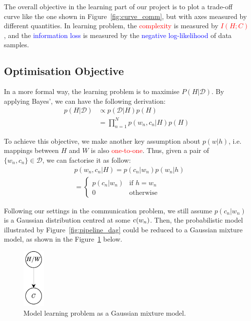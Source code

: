 \documentclass[11pt]{article}
\begin{document}
The overall objective in the learning part of our project is to plot a trade-off curve like the one shown in Figure~\ref{fig:curve_comm}, but with axes measured by different quantities.
In learning problem, the \textcolor{red}{complexity} is measured by \textcolor{red}{$I(H;C)$}, and the \textcolor{blue}{information loss} is measured by the \textcolor{blue}{negative log-likelihood} of data samples. 


\subsection{Optimisation Objective}
\label{ssec:learn_optim}

In a more formal way, the learning problem is to maximise $P(H|\mathcal{D})$. 
By applying Bayes', we can have the following derivation:
\begin{equation}
    \begin{split}
        p(H|\mathcal{D})
        & \propto p(\mathcal{D}|H)p(H) \\
        & = \prod_{n=1}^{N} p(w_n, c_n|H)p(H)
    \end{split}
    \label{eq:learning_objective_pH_D}
\end{equation}

To achieve this objective, we make another key assumption about $p(w|h)$, i.e. mappings between $H$ and $W$ is also \textcolor{red}{one-to-one}.
Thus, given a pair of $\{w_n, c_n\}\in\mathcal{D}$, we can factorise it as follow:
\begin{equation}
    \begin{aligned}
     & p(w_n, c_n|H) = p(c_n|w_n)p(w_n|h) \\
     & =
        \begin{cases}
            p(c_n|w_n) & \text{if $h=w_n$}\\
            0 & \text{otherwise}
        \end{cases} 
    \end{aligned}
    \label{eq:factorise_data_pair}
\end{equation}

Following our settings in the communication problem, we still assume $p(c_n|w_n)$ is a Gaussian distribution centred at some ${\textnormal{c}}(w_n)$.
Then, the probabilistic model illustrated by Figure~\ref{fig:pipeline_dag} could be reduced to a Gaussian mixture model, as shown in the Figure~\ref{fig:learn_gaussian_mix} below.
\begin{figure}[h]
    \centering
    \includegraphics[width=0.1\textwidth]{docs/intro_rate_distortion/graphs/mixture_gaussian.pdf}
    \caption{Model learning problem as a Gaussian mixture model.}
    \label{fig:learn_gaussian_mix}
\end{figure}
\end{document}
